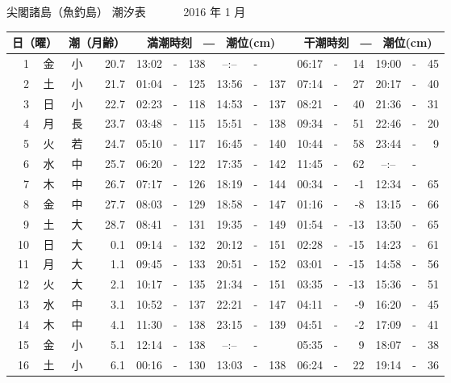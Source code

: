 \documentclass[12pt.a4j]{jsarticle}
\begin{document}
\pagestyle{empty}
 \begin{center}
 {\LARGE 尖閣諸島（魚釣島）  潮汐表　　　}
 {\large 2016 年  1 月}\\
 \begin{table}[ht]
    \begin{tabular}{|rc|cr|ccrccr|ccrccr|}
    \hline
    \multicolumn{2}{|c|}{日（曜）} & \multicolumn{2}{c|}{潮（月齢）} & \multicolumn{6}{c|}{満潮時刻　―　潮位(cm)} & \multicolumn{6}{c|}{干潮時刻　―　潮位(cm)} \\
 \hline
 1 & 金 & 小 & 20.7 &  13:02 &-& 138  &  --:-- &-&     &   06:17 &-&  14  &   19:00 &-&  45  \\
 2 & 土 & 小 & 21.7 &  01:04 &-& 125  &  13:56 &-& 137  &   07:14 &-&  27  &   20:17 &-&  40  \\
 3 & 日 & 小 & 22.7 &  02:23 &-& 118  &  14:53 &-& 137  &   08:21 &-&  40  &   21:36 &-&  31  \\
 4 & 月 & 長 & 23.7 &  03:48 &-& 115  &  15:51 &-& 138  &   09:34 &-&  51  &   22:46 &-&  20  \\
 5 & 火 & 若 & 24.7 &  05:10 &-& 117  &  16:45 &-& 140  &   10:44 &-&  58  &   23:44 &-&   9  \\
 6 & 水 & 中 & 25.7 &  06:20 &-& 122  &  17:35 &-& 142  &   11:45 &-&  62  &   --:-- &-&     \\
 7 & 木 & 中 & 26.7 &  07:17 &-& 126  &  18:19 &-& 144  &   00:34 &-&  -1  &   12:34 &-&  65  \\
 8 & 金 & 中 & 27.7 &  08:03 &-& 129  &  18:58 &-& 147  &   01:16 &-&  -8  &   13:15 &-&  66  \\
 9 & 土 & 大 & 28.7 &  08:41 &-& 131  &  19:35 &-& 149  &   01:54 &-& -13  &   13:50 &-&  65  \\
10 & 日 & 大 &  0.1 &  09:14 &-& 132  &  20:12 &-& 151  &   02:28 &-& -15  &   14:23 &-&  61  \\
11 & 月 & 大 &  1.1 &  09:45 &-& 133  &  20:51 &-& 152  &   03:01 &-& -15  &   14:58 &-&  56  \\
12 & 火 & 大 &  2.1 &  10:17 &-& 135  &  21:34 &-& 151  &   03:35 &-& -13  &   15:36 &-&  51  \\
13 & 水 & 中 &  3.1 &  10:52 &-& 137  &  22:21 &-& 147  &   04:11 &-&  -9  &   16:20 &-&  45  \\
14 & 木 & 中 &  4.1 &  11:30 &-& 138  &  23:15 &-& 139  &   04:51 &-&  -2  &   17:09 &-&  41  \\
15 & 金 & 小 &  5.1 &  12:14 &-& 138  &  --:-- &-&     &   05:35 &-&   9  &   18:07 &-&  38  \\
16 & 土 & 小 &  6.1 &  00:16 &-& 130  &  13:03 &-& 138  &   06:24 &-&  22  &   19:14 &-&  36  \\

\end{tabular}
\end{table}
\end{center}
\end{document}
